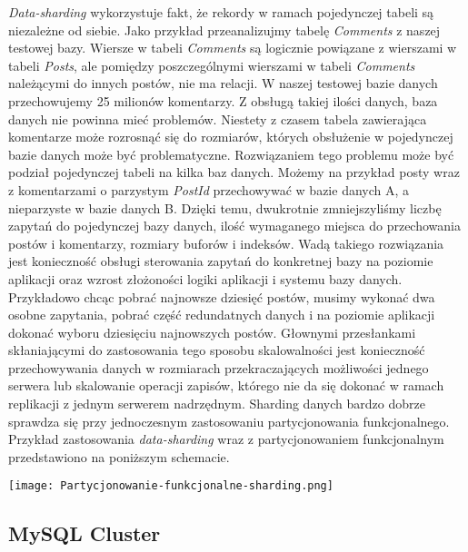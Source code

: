 \textit{Data-sharding} wykorzystuje fakt, że rekordy w ramach pojedynczej tabeli są niezależne od siebie. Jako przykład przeanalizujmy tabelę \textit{Comments} z naszej testowej bazy.
Wiersze w tabeli \textit{Comments} są logicznie powiązane z wierszami w tabeli \textit{Posts}, ale pomiędzy poszczególnymi wierszami w tabeli \textit{Comments} należącymi do innych postów, nie ma relacji. W naszej testowej bazie danych przechowujemy 25 milionów komentarzy. Z obsługą takiej ilości danych, baza danych nie powinna mieć problemów. Niestety z czasem tabela zawierająca komentarze może rozrosnąć się do rozmiarów, których obsłużenie w pojedynczej bazie danych może być problematyczne. Rozwiązaniem tego problemu może być podział pojedynczej tabeli na kilka baz danych. Możemy na przykład posty wraz z komentarzami o parzystym \textit{PostId} przechowywać w bazie danych A, a nieparzyste w bazie danych B. Dzięki temu, dwukrotnie zmniejszyliśmy liczbę zapytań do pojedynczej bazy danych, ilość wymaganego miejsca do przechowania postów i komentarzy, rozmiary buforów i indeksów. Wadą takiego rozwiązania jest konieczność obsługi sterowania zapytań do konkretnej bazy na poziomie aplikacji oraz wzrost złożoności logiki aplikacji i systemu bazy danych. Przykładowo chcąc pobrać najnowsze dziesięć postów, musimy wykonać dwa osobne zapytania, pobrać część redundatnych danych i na poziomie aplikacji dokonać wyboru dziesięciu najnowszych postów.
Głownymi przesłankami skłaniającymi do zastosowania tego sposobu skalowalności jest konieczność przechowywania danych w rozmiarach przekraczających możliwości jednego serwera lub skalowanie operacji zapisów, którego nie da się dokonać w ramach replikacji z jednym serwerem nadrzędnym. Sharding danych bardzo dobrze sprawdza się przy jednoczesnym zastosowaniu partycjonowania funkcjonalnego. Przykład zastosowania \textit{data-sharding} wraz z partycjonowaniem funkcjonalnym przedstawiono na poniższym schemacie.
\begin{center}
	\texttt{[image: Partycjonowanie-funkcjonalne-sharding.png]} 
\end{center}


\subsection{MySQL Cluster}